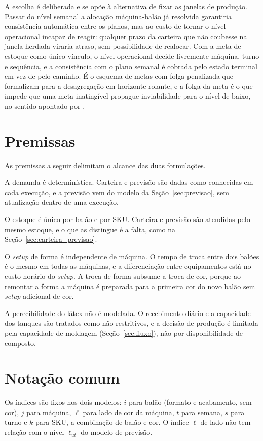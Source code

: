 \documentclass[
    12pt,
    openright,
    oneside,
    a4paper,
    fleqn,
    chapter=TITLE,
    section=TITLE,
    english,
    brazil
]{abntex2}
\begin{document}
A escolha é deliberada e se opõe à alternativa de fixar as janelas de produção. Passar do nível semanal a alocação máquina-balão já resolvida garantiria consistência automática entre os planos, mas ao custo de tornar o nível operacional incapaz de reagir: qualquer prazo da carteira que não coubesse na janela herdada viraria atraso, sem possibilidade de realocar. Com a meta de estoque como único vínculo, o nível operacional decide livremente máquina, turno e sequência, e a consistência com o plano semanal é cobrada pelo estado terminal em vez de pelo caminho. É o esquema de metas com folga penalizada que  formalizam para a desagregação em horizonte rolante, e a folga da meta é o que impede que uma meta inatingível propague inviabilidade para o nível de baixo, no sentido apontado por .

\section{Premissas}
\label{sec:premissas}

As premissas a seguir delimitam o alcance das duas formulações.

A demanda é determinística. Carteira e previsão são dadas como conhecidas em cada execução, e a previsão vem do modelo da Seção~\ref{sec:previsao}, sem atualização dentro de uma execução.

O estoque é único por balão e por SKU. Carteira e previsão são atendidas pelo mesmo estoque, e o que as distingue é a falta, como na Seção~\ref{sec:carteira_previsao}.

O \textit{setup} de forma é independente de máquina. O tempo de troca entre dois balões é o mesmo em todas as máquinas, e a diferenciação entre equipamentos está no custo horário do \textit{setup}. A troca de forma subsume a troca de cor, porque ao remontar a forma a máquina é preparada para a primeira cor do novo balão sem \textit{setup} adicional de cor.

A perecibilidade do látex não é modelada. O recebimento diário e a capacidade dos tanques são tratados como não restritivos, e a decisão de produção é limitada pela capacidade de moldagem (Seção~\ref{sec:fluxo}), não por disponibilidade de composto.

\section{Notação comum}

Os índices são fixos nos dois modelos: $i$ para balão (formato e acabamento, sem cor), $j$ para máquina, $\ell$ para lado de cor da máquina, $t$ para semana, $s$ para turno e $k$ para SKU, a combinação de balão e cor. O índice $\ell$ de lado não tem relação com o nível $\ell_{ut}$ do modelo de previsão.
\end{document}

